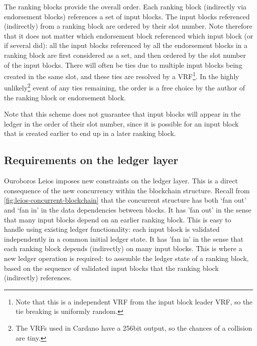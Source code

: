 \documentclass[11pt,a4paper]{article}
\begin{document}
The ranking blocks provide the overall order. Each ranking block (indirectly
via endorsement blocks) references a set of input blocks. The input blocks
referenced (indirectly) from a ranking block are ordered by their slot number.
Note therefore that it does not matter which endorsement block referenced which
input block (or if several did): all the input blocks referenced by all the
endorsement blocks in a ranking block are first considered as a set, and then
ordered by the slot number of the input blocks. There will often be ties due to
multiple input blocks being created in the same slot, and these ties are
resolved by a VRF\footnote{Note that this is a independent VRF from the input
block leader VRF, so the tie breaking is uniformly random.}. In the highly
unlikely\footnote{The VRFs used in Cardano have a 256bit output, so the chances
of a collision are tiny.} event of any ties remaining, the order is a free
choice by the author of the ranking block or endorsement block.

Note that this scheme does not guarantee that input blocks will appear in the
ledger in the order of their slot number, since it is possible for an input
block that is created earlier to end up in a later ranking block.

\subsection{Requirements on the ledger layer}
\label{sec:requirements-on-the-ledger-layer}

Ouroboros Leios imposes new constraints on the ledger layer. This is a direct
consequence of the new concurrency within the blockchain structure. Recall from
\cref{fig:leios-concurrent-blockchain} that the concurrent structure has both
`fan out' and `fan in' in the data dependencies between blocks. It has 'fan out'
in the sense that many input blocks depend on an earlier ranking block. This is
easy to handle using existing ledger functionality: each input block is
validated independently in a common initial ledger state. It has 'fan in' in
the sense that each ranking block depends (indirectly) on many input blocks.
This is where a new ledger operation is required: to assemble the ledger state
of a ranking block, based on the sequence of validated input blocks that
the ranking block (indirectly) references.
\end{document}
